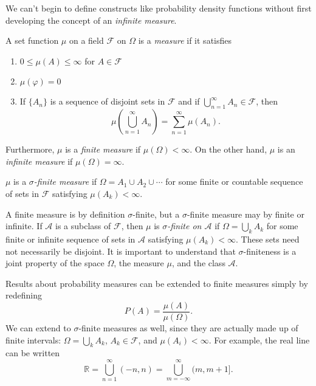 \documentclass[11pt,fleqn]{book} %
\begin{document}
We can't begin to define constructs like probability density functions without first developing the concept of an \emph{infinite measure}.

\begin{definition} \label{def:general-measure}
	A set function $\mu$ on a field $\mathcal{F}$ on $\Omega$ is a \emph{measure} if it satisfies
	\begin{enumerate}[label=(\Roman*)]
		\item $0 \leq \mu(A) \leq \infty$ for $A \in \mathcal{F}$
		\item $\mu(\varphi) = 0$
		\item If $\{A_n\}$ is a sequence of disjoint sets in $\mathcal{F}$ and if $\bigcup_{n=1}^\infty A_n \in \mathcal{F}$, then
		\[
			\mu \left( \bigcup_{n=1}^\infty A_n \right) = \sum_{n=1}^\infty \mu(A_n).
		\]
	\end{enumerate}
	Furthermore, $\mu$ is a \emph{finite measure} if $\mu(\Omega) < \infty$. On the other hand, $\mu$ is an \emph{infinite measure} if $\mu(\Omega) = \infty$.
\end{definition}

\begin{definition} \label{def:sigma-finite-measure}
	$\mu$ is a \emph{$\sigma$-finite measure} if $\Omega = A_1 \cup A_2 \cup \cdots$ for some finite or countable sequence of sets in $\mathcal{F}$ satisfying $\mu(A_k) < \infty$.
\end{definition}

A finite measure is by definition $\sigma$-finite, but a $\sigma$-finite measure may by finite or infinite. If $\mathcal{A}$ is a subclass of $\mathcal{F}$, then $\mu$ is \emph{$\sigma$-finite on $\mathcal{A}$} if $\Omega = \bigcup_k A_k$ for some finite or infinite sequence of sets in $\mathcal{A}$ satisfying $\mu(A_k) < \infty$. These sets need not necessarily be disjoint. It is important to understand that $\sigma$-finiteness is a joint property of the space $\Omega$, the measure $\mu$, and the class $\mathcal{A}$.

Results about probability measures can be extended to finite measures simply by redefining
\[
	P(A) = \frac{\mu(A)}{\mu(\Omega)}.
\]
We can extend to $\sigma$-finite measures as well, since they are actually made up of finite intervals: $\Omega = \bigcup_k A_k$, $A_k \in \mathcal{F}$, and $\mu(A_i) < \infty$. For example, the real line can be written
\[
	\mathbb{R} = \bigcup_{n=1}^\infty (-n,n) = \bigcup_{m=-\infty}^\infty (m,m+1].
\]
\end{document}
